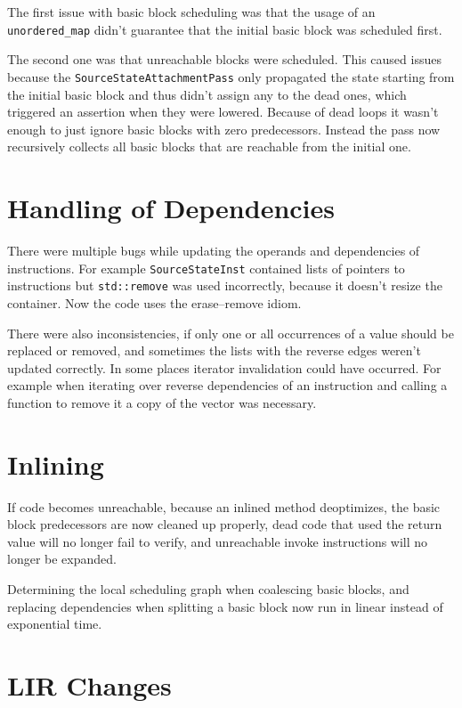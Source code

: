 \documentclass[draft,final]{vutinfth} %
\begin{document}
    The first issue with basic block scheduling was that
    the usage of an \lstinline{unordered_map} didn't guarantee that the initial basic block was scheduled first.

    The second one was that unreachable blocks were scheduled.
    This caused issues because the \lstinline{SourceStateAttachmentPass} only propagated the state starting from the initial basic block
    and thus didn't assign any to the dead ones,
    which triggered an assertion when they were lowered.
    Because of dead loops it wasn't enough to just ignore basic blocks with zero predecessors.
    Instead the pass now recursively collects all basic blocks that are reachable from the initial one.


    \section{Handling of Dependencies}

    There were multiple bugs while updating the operands and dependencies of instructions.
    For example \lstinline{SourceStateInst} contained lists of pointers to instructions but \lstinline{std::remove} was used incorrectly,
    because it doesn't resize the container.
    Now the code uses the erase–remove idiom.

    There were also inconsistencies, if only one or all occurrences of a value should be replaced or removed,
    and sometimes the lists with the reverse edges weren't updated correctly.
    In some places iterator invalidation could have occurred.
    For example when iterating over reverse dependencies of an instruction and calling a function to remove it a copy of the vector was necessary.


    \section{Inlining}

    If code becomes unreachable,
    because an inlined method deoptimizes,
    the basic block predecessors are now cleaned up properly,
    dead code that used the return value will no longer fail to verify,
    and unreachable invoke instructions will no longer be expanded.

    Determining the local scheduling graph when coalescing basic blocks,
    and replacing dependencies when splitting a basic block
    now run in linear instead of exponential time.


    \section{LIR Changes}
\end{document}
